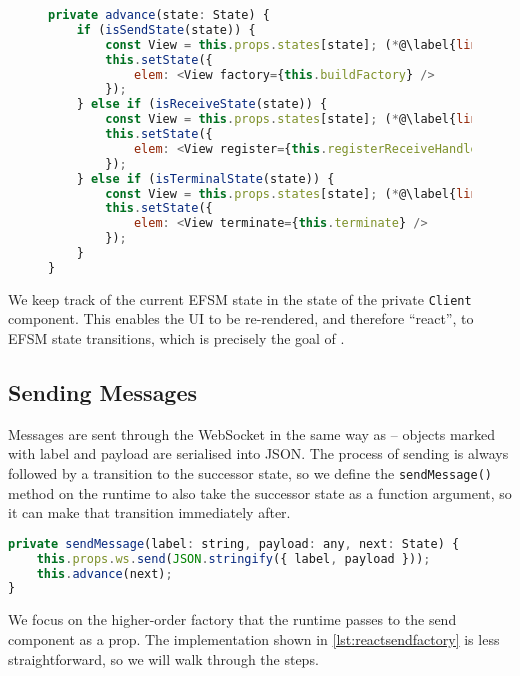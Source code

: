 \begin{figure}[!h]
\begin{lstlisting}[language=javascript]
private advance(state: State) {
	if (isSendState(state)) {
		const View = this.props.states[state]; (*@\label{line:reactadvance1}@*)
		this.setState({	
			elem: <View factory={this.buildFactory} />
		});
	} else if (isReceiveState(state)) {
		const View = this.props.states[state]; (*@\label{line:reactadvance2}@*)
		this.setState({
			elem: <View register={this.registerReceiveHandler} />
		});
	} else if (isTerminalState(state)) {
		const View = this.props.states[state]; (*@\label{line:reactadvance3}@*)
		this.setState({
			elem: <View terminate={this.terminate} />
		});
	}
}
\end{lstlisting}
\label{lst:reacttransitionfunc}
\end{figure}

We keep track of the current EFSM state in the state of the
private \texttt{Client} component.
This enables the UI to be re-rendered, and therefore ``react'',
to EFSM state transitions, which is precisely the goal of .

\subsection{Sending Messages}
Messages are sent through the WebSocket in the same way 
as  -- objects marked with label and payload
are serialised into JSON. The process of sending is always followed
by a transition to the successor state, so we define the
\texttt{sendMessage()} method on the runtime to also take
the successor state as a function argument, so it can make that transition
immediately after.

\begin{lstlisting}[language=javascript,numbers=none]
private sendMessage(label: string, payload: any, next: State) {
	this.props.ws.send(JSON.stringify({ label, payload }));
	this.advance(next);
}
\end{lstlisting}

We focus on the higher-order factory that the runtime passes
to the send component as a prop. The implementation shown in
\cref{lst:reactsendfactory} is less straightforward,
so we will walk through the steps.

